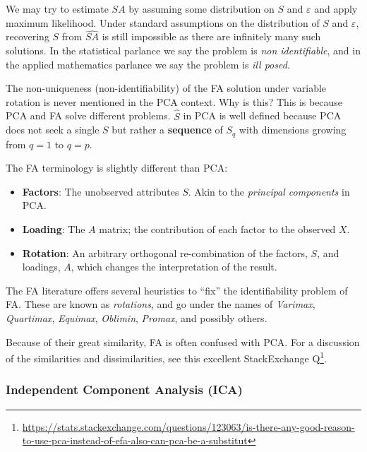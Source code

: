 \documentclass[]{book}
\renewcommand{\href}[2]{#2\footnote{\url{#1}}}
\theoremstyle{definition}
\theoremstyle{definition}
\theoremstyle{definition}
\theoremstyle{remark}
\let\BeginKnitrBlock\begin \let\EndKnitrBlock\end
\begin{document}
We may try to estimate \(S A\) by assuming some distribution on \(S\) and \(\varepsilon\) and apply maximum likelihood.
Under standard assumptions on the distribution of \(S\) and \(\varepsilon\), recovering \(S\) from \(\widehat{S A }\) is still impossible as there are infinitely many such solutions.
In the statistical parlance we say the problem is \emph{non identifiable}, and in the applied mathematics parlance we say the problem is \emph{ill posed}.

\BeginKnitrBlock{remark}
{}The non-uniqueness (non-identifiability) of the FA solution under variable rotation is never mentioned in the PCA context.
Why is this?
This is because PCA and FA solve different problems.
\(\hat S\) in PCA is well defined because PCA does not seek a single \(S\) but rather a \textbf{sequence} of \(S_q\) with dimensions growing from \(q=1\) to \(q=p\).
\EndKnitrBlock{remark}

The FA terminology is slightly different than PCA:

\begin{itemize}
\item
  \textbf{Factors}:
  The unobserved attributes \(S\).
  Akin to the \emph{principal components} in PCA.
\item
  \textbf{Loading}:
  The \(A\) matrix; the contribution of each factor to the observed \(X\).
\item
  \textbf{Rotation}:
  An arbitrary orthogonal re-combination of the factors, \(S\), and loadings, \(A\), which changes the interpretation of the result.
\end{itemize}

The FA literature offers several heuristics to ``fix'' the identifiability problem of FA.
These are known as \emph{rotations}, and go under the names of \emph{Varimax}, \emph{Quartimax}, \emph{Equimax}, \emph{Oblimin}, \emph{Promax}, and possibly others.

Because of their great similarity, FA is often confused with PCA.
For a discussion of the similarities and dissimilarities, see this excellent \href{https://stats.stackexchange.com/questions/123063/is-there-any-good-reason-to-use-pca-instead-of-efa-also-can-pca-be-a-substitut}{StackExchange Q}.

\hypertarget{independent-component-analysis-ica}{%
\subsubsection{Independent Component Analysis (ICA)}\label{independent-component-analysis-ica}}
\end{document}
